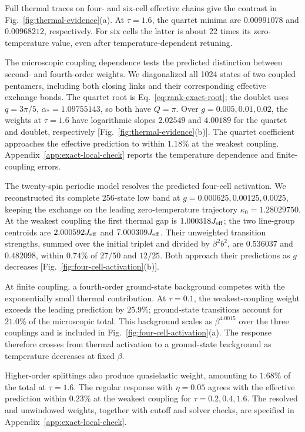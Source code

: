Full thermal traces on four- and six-cell effective chains give the
contrast in Fig.~\ref{fig:thermal-evidence}(a). At $\tau=1.6$, the quartet
minima are $0.00991078$ and $0.00968212$, respectively. For six cells the
latter is about 22 times its zero-temperature value, even after
temperature-dependent retuning.

The microscopic coupling dependence tests the predicted distinction
between second- and fourth-order weights.
We diagonalized all 1024 states of two coupled pentamers, including both
closing links and their corresponding effective exchange bonds.
The quartet root is Eq.~\eqref{eq:rank-exact-root}; the doublet uses
$q=3\pi/5$, $\alpha_*=1.09755143$, so both have $Q=\pi$.
Over $g=0.005,0.01,0.02$, the weights at $\tau=1.6$ have logarithmic
slopes $2.02549$ and $4.00189$ for the quartet and doublet, respectively
[Fig.~\ref{fig:thermal-evidence}(b)]. The quartet coefficient approaches
the effective prediction to within $1.18\%$ at the weakest coupling.
Appendix~\ref{app:exact-local-check} reports the temperature dependence
and finite-coupling errors.

The twenty-spin periodic model resolves the predicted four-cell activation.
We reconstructed its complete 256-state low band at
$g=0.000625,0.00125,0.0025$, keeping the exchange on the leading
zero-temperature trajectory $\kappa_0=1.28029750$.
At the weakest coupling the first
thermal gap is $1.000318J_{\rm eff}$; the two line-group centroids are
$2.000592J_{\rm eff}$ and $7.000309J_{\rm eff}$. Their unweighted
transition strengths, summed over the initial triplet and divided by
$\beta^2b^2$, are $0.536037$ and $0.482098$, within $0.74\%$ of
$27/50$ and $12/25$. Both approach their predictions as $g$ decreases
[Fig.~\ref{fig:four-cell-activation}(b)].

At finite coupling, a fourth-order ground-state background competes with
the exponentially small thermal contribution. At $\tau=0.1$, the
weakest-coupling weight exceeds the leading prediction by $25.9\%$;
ground-state transitions account for $21.0\%$ of the microscopic total.
This background scales as $\beta^{4.0015}$ over the three couplings and
is included in Fig.~\ref{fig:four-cell-activation}(a).
The response therefore crosses from thermal activation to a
ground-state background as temperature decreases at fixed $\beta$.

Higher-order splittings also produce quasielastic weight, amounting to
$1.68\%$ of the total at $\tau=1.6$.
The regular response with $\eta=0.05$ agrees with the effective
prediction within $0.23\%$ at the weakest coupling for
$\tau=0.2,0.4,1.6$. The resolved and unwindowed weights, together with
cutoff and solver checks, are specified in
Appendix~\ref{app:exact-local-check}.

